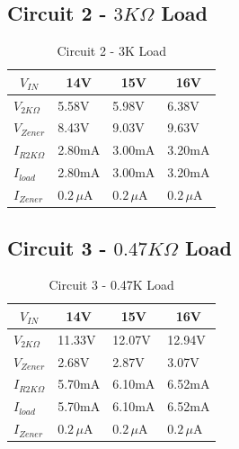 \documentclass[12pt]{article}
\begin{document}
\subsection{Circuit 2 - $3K\Omega$ Load}
\begin{table}[H]
  \caption{Circuit 2 - 3K Load}\label{tab:3kload}
  \begin{center}
    \begin{tabular}[c]{|l|l|l|l|}
      \hline
      \multicolumn{1}{|c|}{\textbf{$V_{IN}$}} &
      \multicolumn{1}{|c|}{\textbf{14V}} &
      \multicolumn{1}{|c|}{\textbf{15V}} &
      \multicolumn{1}{|c|}{\textbf{16V}} \\
      \hline
      \textbf{$V_{2K\Omega}$} & 5.58V & 5.98V & 6.38V  \\
      \textbf{$V_{Zener}$} & 8.43V & 9.03V & 9.63V \\
      \textbf{$I_{R2K\Omega}$} & 2.80mA & 3.00mA & 3.20mA \\
      \textbf{$I_{load}$} & 2.80mA & 3.00mA & 3.20mA \\
      \textbf{$I_{Zener}$} & $0.2\,\mu\text{A}$ & $0.2\,\mu\text{A}$ & $0.2\,\mu\text{A}$ \\
      \hline
    \end{tabular}
  \end{center}
\end{table}

\subsection{Circuit 3 - $0.47K\Omega$ Load}
\begin{table}[H]
  \caption{Circuit 3 - 0.47K Load}\label{tab:.47kload}
  \begin{center}
    \begin{tabular}[c]{|l|l|l|l|}
      \hline
      \multicolumn{1}{|c|}{\textbf{$V_{IN}$}} &
      \multicolumn{1}{|c|}{\textbf{14V}} &
      \multicolumn{1}{|c|}{\textbf{15V}} &
      \multicolumn{1}{|c|}{\textbf{16V}} \\
      \hline
      \textbf{$V_{2K\Omega}$} & 11.33V & 12.07V & 12.94V  \\
      \textbf{$V_{Zener}$} & 2.68V & 2.87V & 3.07V \\
      \textbf{$I_{R2K\Omega}$} & 5.70mA & 6.10mA & 6.52mA \\
      \textbf{$I_{load}$} & 5.70mA & 6.10mA & 6.52mA \\
      \textbf{$I_{Zener}$} & $0.2\,\mu\text{A}$ & $0.2\,\mu\text{A}$ & $0.2\,\mu\text{A}$ \\
      \hline
    \end{tabular}
  \end{center}
\end{table}
\end{document}
